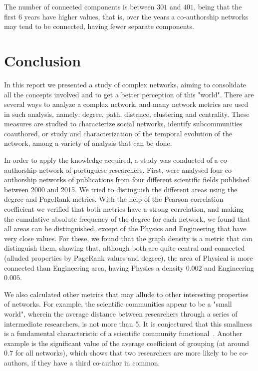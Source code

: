 \documentclass{article}
\begin{document}
\begin{multicols}{2}
The number of connected components is between $301$ and $401$, being that the first 6 years have higher values, that is, over the years a co-authorship networks may tend to be connected, having fewer separate components.


\section{Conclusion}
\label{section.conclusions}

In this report we presented a study of complex networks, aiming to consolidate all the concepts involved and to get a better perception of this "world". There are several ways to analyze a complex network, and many network metrics are used in such analysis, namely: degree, path, distance, clustering and centrality. These measures are studied to characterize social networks, identify subcommunities coauthored, or study and characterization of the temporal evolution of the network, among a variety of analysis that can be done.

In order to apply the knowledge acquired, a study was conducted of a co-authorship network of portuguese researchers. First, were analysed four co-authorship networks of publications from four different scientific fields published between 2000 and 2015. We tried to distinguish the different areas using the degree and PageRank metrics. With the help of the Pearson correlation coefficient we verified that both metrics have a strong correlation, and making the cumulative absolute frequency of the degree for each network, we found that all areas can be distinguished, except of the Physics and Engineering that have very close values. For these, we found that the graph density is a metric that can distinguish them, showing that, although both are quite central and connected (alluded properties by PageRank values and degree), the area of Physical is more connected than Engineering area, having Physics a density $0.002$ and Engineering $0.005$.

We also calculated other metrics that may allude to other interesting properties of networks. For example, the scientific communities appear to be a "small world", wherein the average distance between researchers through a series of intermediate researchers, is not more than 5. It is conjectured that this smallness is a fundamental characteristic of a scientific community functional~\cite{newman2001structure}. Another example is the significant value of the average coefficient of grouping (at around $0.7$ for all networks), which shows that two researchers are more likely to be co-authors, if they have a third co-author in common.


\end{multicols}
\end{document}
